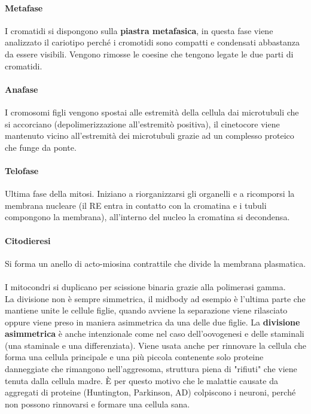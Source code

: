 \documentclass[10pt]{article}
\begin{document}
\paragraph*{Metafase} I cromatidi si dispongono sulla \textbf{piastra metafasica}, in questa fase viene analizzato il cariotipo perché i cromotidi sono compatti e condensati abbastanza da essere visibili. Vengono rimosse le coesine che tengono legate le due parti di cromatidi.
\paragraph*{Anafase} I cromosomi figli vengono spostai alle estremità della cellula dai microtubuli che si accorciano (depolimerizzazione all'estremitò positiva), il cinetocore viene mantenuto vicino all'estremità dei microtubuli grazie ad un complesso proteico che funge da ponte.
\paragraph*{Telofase} Ultima fase della mitosi. Iniziano a riorganizzarsi gli organelli e a ricomporsi la membrana nucleare (il RE entra in contatto con la cromatina e i tubuli compongono la membrana), all'interno del nucleo la cromatina si decondensa. 
\paragraph*{Citodieresi} Si forma un anello di acto-miosina contrattile che divide la membrana plasmatica.\\\\
I mitocondri si duplicano per scissione binaria grazie alla polimerasi gamma.\\
La divisione non è sempre simmetrica, il midbody ad esempio è l'ultima parte che mantiene unite le cellule figlie, quando avviene la separazione viene rilasciato oppure viene preso in maniera asimmetrica da una delle due figlie. La \textbf{divisione asimmetrica} è anche intenzionale come nel caso dell'oovogenesi e delle staminali (una staminale e una differenziata). Viene usata anche per rinnovare la cellula che forma una cellula principale e una più piccola contenente solo proteine danneggiate che rimangono nell'aggresoma, struttura piena di "rifiuti" che viene tenuta dalla cellula madre. È per questo motivo che le malattie causate da aggregati di proteine (Huntington, Parkinson, AD) colpiscono i neuroni, perché non possono rinnovarsi e formare una cellula sana.
\end{document}
